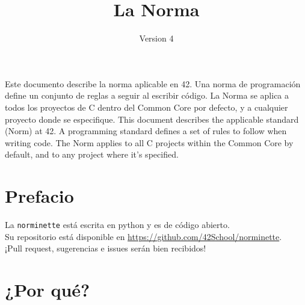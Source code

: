 \documentclass{42-es}
\begin{document}
\title{La Norma}
\subtitle{Version 4}

\summary
{
      Este documento describe la norma aplicable en 42. Una norma de
      programación
      define un conjunto de reglas a seguir al escribir código. La Norma se
      aplica
      a todos los proyectos de C dentro del Common Core por defecto, y a
      cualquier
      proyecto donde se especifique.
      This document describes the applicable standard (Norm) at 42. A
      programming standard defines a set of rules to follow when writing code.
      The Norm applies to all C projects within the Common Core by default, and
      to any project where it's specified.
}

\maketitle

\tableofcontents

\chapter{Prefacio}

La \texttt{norminette} está escrita en python y es de código abierto. \\
Su repositorio está disponible en \url{https://github.com/42School/norminette}.\\
¡Pull request, sugerencias e issues serán bien recibidos!

\newpage

%
%
\chapter{¿Por qué?}
\end{document}

